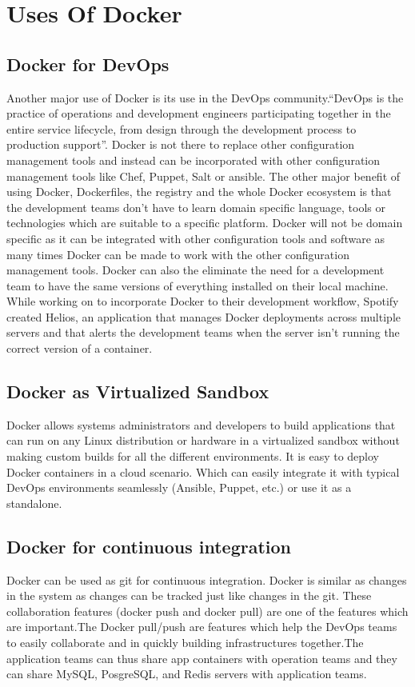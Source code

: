 \documentclass[9pt,twocolumn,twoside]{styles/osajnl}
\begin{document}
\section{Uses Of Docker}

\subsection{Docker for DevOps}
Another major use of Docker is its use in the DevOps
community.``DevOps is the practice of operations and development
engineers participating together in the entire service lifecycle, from
design through the development process to production
support\cite{www-devops}''. Docker is not there to replace other
configuration management tools and instead can be incorporated with
other configuration management tools like Chef, Puppet, Salt or
ansible. The other major benefit of using Docker, Dockerfiles, the
registry and the whole Docker ecosystem is that the development teams
don't have to learn domain specific language, tools or technologies
which are suitable to a specific platform. Docker will
not be domain specific as it can be integrated with other
configuration tools and software as many times Docker can be
made to work with the other configuration management tools. Docker can
also the eliminate the need for a development team to have the same
versions of everything installed on their local
machine\cite{www-docker-1}. While working on to incorporate Docker to
their development workflow, Spotify created Helios, an application that
manages Docker deployments across multiple servers and that alerts the
development teams when the server isn't running the correct version of
a container.

\subsection{Docker as Virtualized Sandbox}
Docker allows systems administrators and developers to build
applications that can run on any Linux distribution or hardware in a
virtualized sandbox without making custom builds for all the different
environments\cite{www-docker-1}. It is easy to deploy Docker
containers in a cloud scenario. Which can easily integrate it with
typical DevOps environments seamlessly (Ansible, Puppet, etc.) or use
it as a standalone.

\subsection{Docker for continuous integration}
Docker can be used as git for continuous integration. Docker is
similar as changes in the system as changes can be tracked just like
changes in the git.  These collaboration features (docker push and
docker pull) are one of the features which are important.The Docker
pull/push are features which help the DevOps teams to easily
collaborate and in quickly building infrastructures together.The
application teams can thus share app containers with operation teams
and they can share MySQL, PosgreSQL, and Redis servers with
application teams\cite{www-docker-2}.
\end{document}
